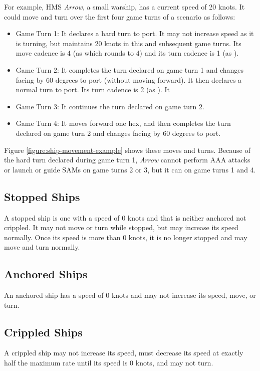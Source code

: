 {    For example, HMS {\itshape Arrow}, a small warship, has a current speed of 20 knots. It could move and turn over the first four game turns of a scenario as follows:
    \begin{itemize}
        \item Game Turn 1:  It declares a hard turn to port. It may not increase speed as it is turning, but maintains 20 knots in this and subsequent game turns. Its move cadence is 4 (as  which rounds to 4) and its turn cadence is 1 (as ).
        \item Game Turn 2: It completes the turn declared on game turn 1 and changes facing by 60 degrees to port (without moving forward). It then declares a normal turn to port. Its turn cadence is 2 (as ). It
        \item Game Turn 3: It continues the turn declared on game turn 2.
        \item Game Turn 4: It moves forward one hex, and then completes the turn declared on game turn 2 and changes facing by 60 degrees to port.
    \end{itemize}
    Figure \ref{figure:ship-movement-example} shows these moves and turns. Because of the hard turn declared during game turn 1, {\itshape Arrow} cannot perform AAA attacks or launch or guide SAMs on game turns 2 or 3, but it can on game turns 1 and 4.

    \subsection{Stopped Ships} A stopped ship is one with a speed of 0 knots and that is neither anchored not crippled. It may not move or turn while stopped, but may increase its speed normally. Once its speed is more than 0 knots, it is no longer stopped and may move and turn normally.

    \subsection{Anchored Ships} An anchored ship has a speed of 0 knots and may not increase its speed, move, or turn.

    \subsection{Crippled Ships} A crippled ship may not increase its speed, must decrease its speed at exactly half the maximum rate until its speed is 0 knots, and may not turn.

}

